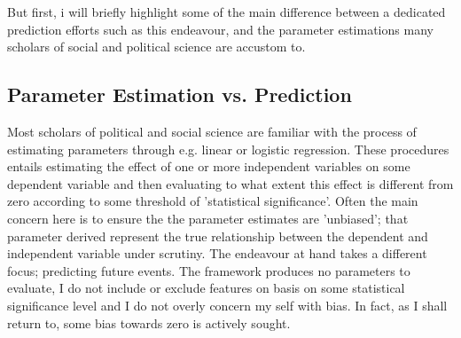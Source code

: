 \documentclass[a4paper]{article}
\begin{document}
But first, i will briefly highlight some of the main difference between a dedicated prediction efforts such as this endeavour, and the parameter estimations many scholars of social and political science are accustom to.\par


\subsection{Parameter Estimation vs. Prediction}

Most scholars of political and social science are familiar with the process of estimating parameters through e.g. linear or logistic regression. These procedures entails estimating the effect of one or more independent variables on some dependent variable and then evaluating to what extent this effect is different from zero according to some threshold of 'statistical significance'. Often the main concern here is to ensure the the parameter estimates are 'unbiased'; that parameter derived represent the true relationship between the dependent and independent variable under scrutiny. The endeavour at hand takes a different focus; predicting future events. The framework produces no parameters to evaluate, I do not include or exclude features on basis on some statistical significance level and I do not overly concern my self with bias. In fact, as I shall return to, some bias towards zero is actively sought.\par
\end{document}
